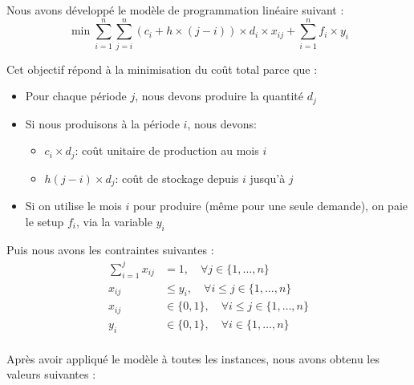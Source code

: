 \documentclass[a4paper,12pt]{article}
\theoremstyle{blueDefinition}
\theoremstyle{redProperty}
\begin{document}
\vspace{10pt}

Nous avons développé le modèle de programmation linéaire suivant :
\begin{equation}
    \min \sum_{i=1}^{n} \sum_{j=i}^{n} (c_i + h \times ( j - i )) \times d_i \times x_{ij} + \sum_{i=1}^{n} f_i \times y_i 
\end{equation}

Cet objectif répond à la minimisation du coût total parce que :
\begin{itemize}
    \item Pour chaque période $j$, nous devons produire la quantité $d_j$
    \item Si nous produisons à la période $i$, nous devons: \begin{itemize}
        \item $c_i \times d_j$: coût unitaire de production au mois $i$
        \item $h( j - i ) \times d_j$: coût de stockage depuis $i$ jusqu'à $j$
    \end{itemize}
    \item Si on utilise le mois $i$ pour produire (même pour une seule demande), on paie le setup $f_i$, via la variable $y_i$
\end{itemize}

\vspace{10pt}

Puis nous avons les contraintes suivantes :
\begin{align}
    \sum_{i=1}^{j} x_{ij} &= 1, \quad \forall j \in \{1, \dots, n\}  \\
    x_{ij} &\leq y_i, \quad \forall i \leq j \in \{1, \dots, n\} \\
    x_{ij} &\in \{0, 1\}, \quad \forall i \leq j \in \{1, \dots, n\} \\
    y_i &\in \{0, 1\}, \quad \forall i \in \{1, \dots, n\} \\
\end{align}


Après avoir appliqué le modèle à toutes les instances, nous avons obtenu les valeurs suivantes :
\end{document}
